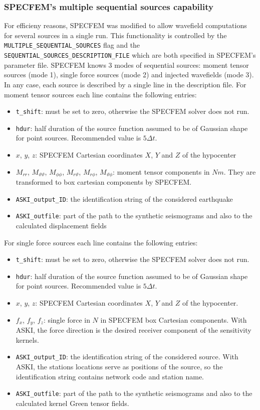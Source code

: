 \subsubsection{SPECFEM's multiple sequential sources capability}
%
For efficieny reasons, SPECFEM was modified to allow wavefield computations for several sources in a single run. This functionality is controlled by the \verb+MULTIPLE_SEQUENTIAL_SOURCES+ flag and the \verb+SEQUENTIAL_SOURCES_DESCRIPTION_FILE+ which are both specified in SPECFEM's parameter file. SPECFEM knows 3 modes of sequential sources: moment tensor sources (mode 1), single force sources (mode 2) and injected wavefields (mode 3). In any case, each source is described by a single line in the description file. For moment tensor sources each line contains the following entries:
\begin{itemize}
	\setlength{\itemsep}{-0.1cm}
  \item \verb+t_shift+: must be set to zero, otherwise the SPECFEM solver does not run.
  \item \verb+hdur+: half duration of the source function assumed to be of Gaussian shape for point sources. Recommended value is $5\Delta t$.
  \item $x$, $y$, $z$: SPECFEM Cartesian coordinates $X$, $Y$ and $Z$ of the hypocenter
  \item $M_{rr}$, $M_{\vartheta\vartheta}$, $M_{\phi\phi}$, $M_{r\vartheta}$, $M_{r\phi}$, $M_{\vartheta\phi}$: moment tensor components in $Nm$. They are transformed to box cartesian components by SPECFEM.
  \item \verb+ASKI_output_ID+: the identification string of the considered earthquake
  \item \verb+ASKI_outfile+: part of the path to the synthetic seismograms and also to the calculated displacement fields
\end{itemize}

For single force sources each line contains the following entries:
\begin{itemize}
	\setlength{\itemsep}{-0.1cm}
  \item \verb+t_shift+: must be set to zero, otherwise the SPECFEM solver does not run.
  \item \verb+hdur+: half duration of the source function assumed to be of Gaussian shape for point sources. Recommended value is $5\Delta t$.
  \item $x$, $y$, $z$: SPECFEM Cartesian coordinates $X$, $Y$ and $Z$ of the hypocenter.
  \item $f_x$, $f_y$, $f_z$: single force in $N$ in SPECFEM box Cartesian components. With ASKI, the force direction is the desired receiver component of the sensitivity kernels.
  \item \verb+ASKI_output_ID+: the identification string of the considered source. With ASKI, the stations locations serve as positions of the source, so the identification string contains network code and station name.
  \item \verb+ASKI_outfile+: part of the path to the synthetic seismograms and also to the calculated kernel Green tensor fields.
\end{itemize}

